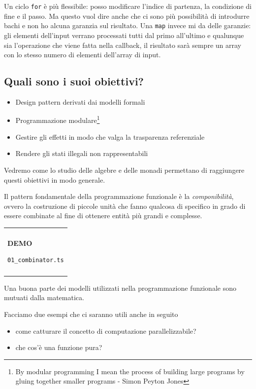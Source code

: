 \documentclass[12pt]{article}
\theoremstyle{definition}
\newenvironment{demo}
    {\begin{center}
    \begin{tabular}{|p{0.9\textwidth}|}
    \hline\\
    }
    {
    \\\\\hline
    \end{tabular}
    \end{center}
    }
\begin{document}
Un ciclo \texttt{for} è più flessibile: posso modificare l'indice di partenza, la condizione di fine e il passo.
Ma questo vuol dire anche che ci sono più possibilità di introdurre bachi e non ho alcuna garanzia sul risultato.
Una \texttt{map} invece mi da delle garanzie: gli elementi dell'input verrano processati tutti dal primo all'ultimo e
qualunque sia l'operazione che viene fatta nella callback, il risultato sarà sempre un array con lo stesso numero di elementi
dell'array di input.

\subsection{Quali sono i suoi obiettivi?}

\begin{itemize}
  \item Design pattern derivati dai modelli formali
  \item Programmazione modulare\footnote{By modular programming I mean the process of building large programs by gluing together smaller programs - Simon Peyton Jones}
  \item Gestire gli effetti in modo che valga la trasparenza referenziale
  \item Rendere gli stati illegali non rappresentabili
\end{itemize}

Vedremo come lo studio delle algebre e delle monadi permettano di raggiungere questi obiettivi in modo generale.

Il pattern fondamentale della programmazione funzionale è la \emph{componibilità}, ovvero la costruzione di piccole unità
che fanno qualcosa di specifico in grado di essere combinate al fine di ottenere entità più grandi e complesse.

\begin{demo}
\begin{center}
\textbf{DEMO}

\texttt{01\_combinator.ts}
\end{center}
\end{demo}

Una buona parte dei modelli utilizzati nella programmazione funzionale sono mutuati dalla matematica.

Facciamo due esempi che ci saranno utili anche in seguito

\begin{itemize}
  \item come catturare il concetto di computazione parallelizzabile?
  \item che cos'è una funzione pura?
\end{itemize}
\end{document}
